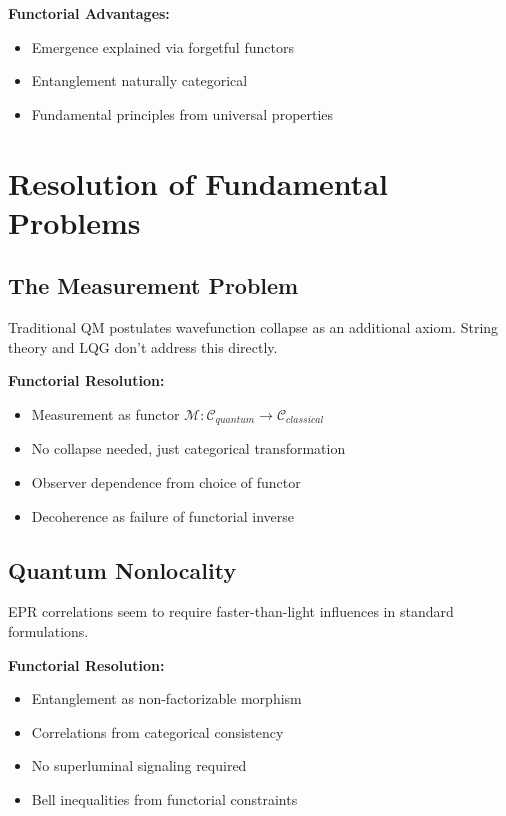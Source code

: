\documentclass[11pt,a4paper]{article}
\begin{document}
\textbf{Functorial Advantages:}
\begin{itemize}
    \item Emergence explained via forgetful functors
    \item Entanglement naturally categorical
    \item Fundamental principles from universal properties
\end{itemize}

\section{Resolution of Fundamental Problems}

\subsection{The Measurement Problem}

Traditional QM postulates wavefunction collapse as an additional axiom. String theory and LQG don't address this directly.

\textbf{Functorial Resolution:}
\begin{itemize}
    \item Measurement as functor $\mathcal{M}: \mathcal{C}_{quantum} \to \mathcal{C}_{classical}$
    \item No collapse needed, just categorical transformation
    \item Observer dependence from choice of functor
    \item Decoherence as failure of functorial inverse
\end{itemize}

\subsection{Quantum Nonlocality}

EPR correlations seem to require faster-than-light influences in standard formulations.

\textbf{Functorial Resolution:}
\begin{itemize}
    \item Entanglement as non-factorizable morphism
    \item Correlations from categorical consistency
    \item No superluminal signaling required
    \item Bell inequalities from functorial constraints
\end{itemize}
\end{document}
